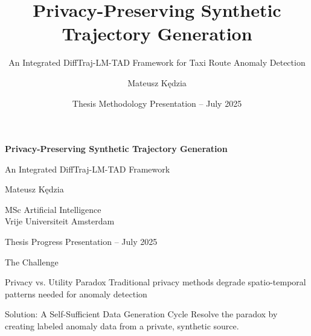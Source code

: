 \documentclass[aspectratio=169,xcolor={dvipsnames}]{beamer}
\title{Privacy-Preserving Synthetic Trajectory Generation}
\subtitle{An Integrated DiffTraj-LM-TAD Framework for Taxi Route Anomaly Detection}
\author{Mateusz Kędzia}
\institute{MSc AI \\ VUA / BJUT}
\date{Thesis Methodology Presentation -- July 2025}
\begin{document}
\begin{frame}[plain]
  \vspace{1.5cm}
  \centering
  {\color{VUBlue}\Huge\textbf{Privacy-Preserving Synthetic Trajectory Generation}}
  
  \vspace{0.5em}
  {\color{RichGold}\Large An Integrated DiffTraj-LM-TAD Framework}
  
  \vspace{1.5em}
  {\large Mateusz Kędzia}
  
  \vspace{0.5em}
  {\normalsize MSc Artificial Intelligence \\ Vrije Universiteit Amsterdam}
  
  \vspace{1em}
  {\small Thesis Progress Presentation -- July 2025}
\end{frame}

\begin{frame}{The Challenge}
  \begin{alertblock}{Privacy vs. Utility Paradox}
    \centering
    \Large Traditional privacy methods degrade spatio-temporal patterns needed for anomaly detection \cite{buchholzSystematisationKnowledgeTrajectory2024}
  \end{alertblock}
  
  \vspace{1em}
  \begin{block}{Solution: A Self-Sufficient Data Generation Cycle}
    \centering
    Resolve the paradox by creating labeled anomaly data from a private, synthetic source.
    \vspace{1em}
    
  \end{block}
\end{frame}
\end{document}
